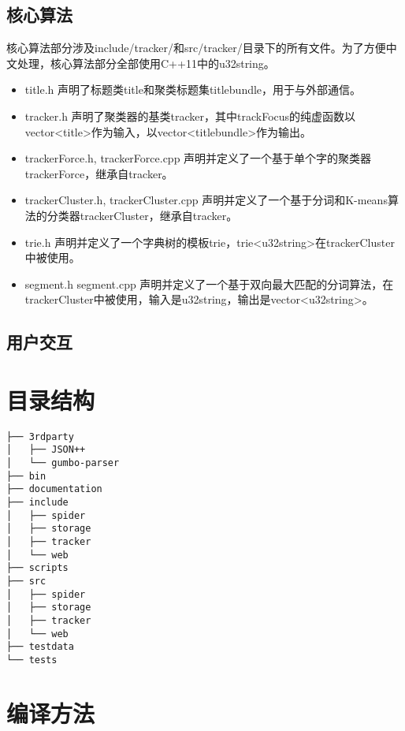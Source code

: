 \documentclass[12pt]{article}
\begin{document}
\subsection{核心算法}
核心算法部分涉及include/tracker/和src/tracker/目录下的所有文件。为了方便中文处理，核心算法部分全部使用C++11中的u32string。
\begin{itemize}
\item title.h 声明了标题类title和聚类标题集titlebundle，用于与外部通信。
\item tracker.h 声明了聚类器的基类tracker，其中trackFocus的纯虚函数以vector<title>作为输入，以vector<titlebundle>作为输出。
\item trackerForce.h, trackerForce.cpp 声明并定义了一个基于单个字的聚类器trackerForce，继承自tracker。
\item trackerCluster.h, trackerCluster.cpp 声明并定义了一个基于分词和K-means算法的分类器trackerCluster，继承自tracker。
\item trie.h 声明并定义了一个字典树的模板trie，trie<u32string>在trackerCluster中被使用。
\item segment.h segment.cpp 声明并定义了一个基于双向最大匹配的分词算法，在trackerCluster中被使用，输入是u32string，输出是vector<u32string>。

\end{itemize}

\subsection{用户交互}


\section{目录结构}
\begin{verbatim}
├── 3rdparty
│   ├── JSON++
│   └── gumbo-parser
├── bin
├── documentation
├── include
│   ├── spider
│   ├── storage
│   ├── tracker
│   └── web
├── scripts
├── src
│   ├── spider
│   ├── storage
│   ├── tracker
│   └── web
├── testdata
└── tests
\end{verbatim}




\section{编译方法}

\end{document}
